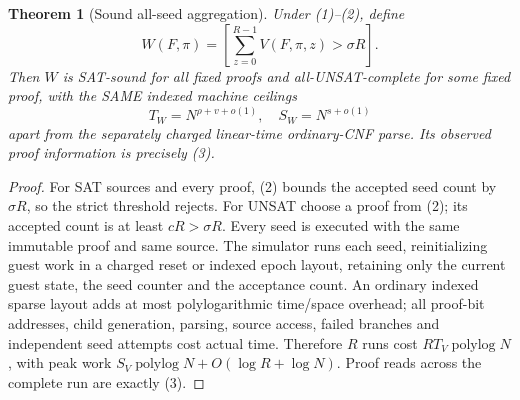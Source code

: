 \documentclass[11pt]{article}
\newtheorem{theorem}{Theorem}
\begin{document}
\begin{theorem}[Sound all-seed aggregation]
Under (1)--(2), define
\[
 W(F,\pi)=\left[\sum_{z=0}^{R-1}V(F,\pi,z)>\sigma R\right]. \tag{5}
\]
Then $W$ is SAT-sound for all fixed proofs and all-UNSAT-complete
for some fixed proof, with the SAME indexed machine ceilings
\[
T_W=N^{\rho+v+o(1)},\quad S_W=N^{s+o(1)}
\]
apart from the separately charged linear-time ordinary-CNF parse.
Its observed proof information is precisely (3).
\end{theorem}
\begin{proof}
For SAT sources and every proof, (2) bounds the accepted seed
count by $\sigma R$, so the strict threshold rejects.
For UNSAT choose a proof from (2); its accepted count is
at least $cR>\sigma R$. Every seed is executed with the same
immutable proof and same source. The simulator runs each seed,
reinitializing guest work in a charged reset or indexed epoch
layout, retaining only the current guest state, the seed
counter and the acceptance count. An ordinary indexed sparse
layout adds at most polylogarithmic time/space overhead; all
proof-bit addresses, child generation, parsing, source access,
failed branches and independent seed attempts cost actual
time. Therefore $R$ runs cost
$RT_V\operatorname{polylog}N$, with peak work
$S_V\operatorname{polylog}N+O(\log R+\log N)$.
Proof reads across the complete run are exactly (3).
\end{proof}
\end{document}
